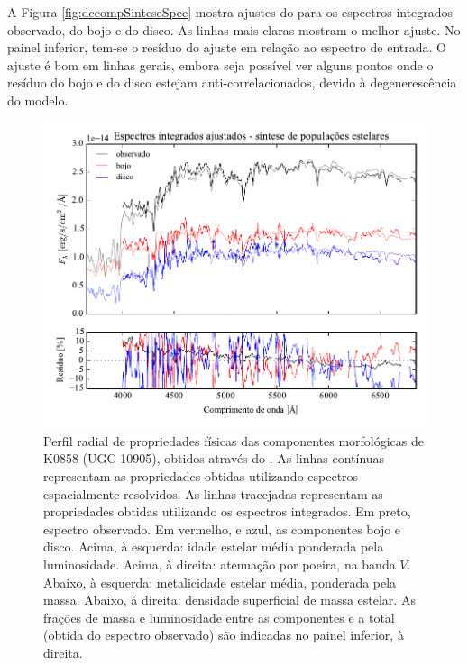 A Figura \ref{fig:decompSinteseSpec} mostra ajustes do \starlight para os
espectros integrados observado, do bojo e do disco. As linhas mais claras
mostram o melhor ajuste. No painel inferior, tem-se o resíduo do ajuste em
relação ao espectro de entrada. O ajuste é bom em linhas gerais, embora seja
possível ver alguns pontos onde o resíduo do bojo e do disco estejam
anti-correlacionados, devido à degenerescência do modelo.


\begin{figure}
	\includegraphics[page=16]{figuras/sample006a_synthesis}
	\caption[Propriedades físicas das componentes morfológicas de K0858 (UGC 10905)]
	{Perfil radial de propriedades físicas das componentes morfológicas de
	K0858 (UGC 10905), obtidos através do \starlight. As linhas contínuas
	representam as propriedades obtidas utilizando espectros espacialmente
	resolvidos. As linhas tracejadas representam as propriedades obtidas utilizando
	os espectros integrados. Em preto, espectro observado. Em vermelho, e azul, as
	componentes bojo e disco. Acima, à esquerda: idade estelar média ponderada pela
	luminosidade. Acima, à direita: atenuação por poeira, na banda $V$. Abaixo, à
	esquerda: metalicidade estelar média, ponderada pela massa. Abaixo, à direita:
	densidade superficial de massa estelar. As frações de massa e luminosidade
	entre as componentes e a total (obtida do espectro observado) são indicadas no
	painel inferior, à direita.}
	\label{fig:decompSinteseRadprof}
\end{figure}

